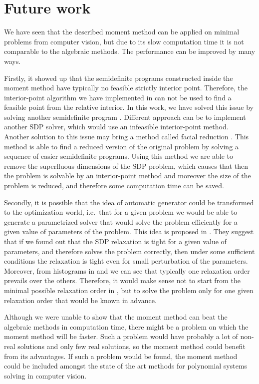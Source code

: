 \section{Future work}
We have seen that the described moment method can be applied on minimal problems from computer vision, but due to its slow computation time it is not comparable to the algebraic methods.
The performance can be improved by many ways.

Firstly, it showed up that the semidefinite programs constructed inside the moment method have typically no feasible strictly interior point.
Therefore, the interior-point algorithm we have implemented in  can not be used to find a feasible point from the relative interior.
In this work, we have solved this issue by solving another semidefinite program .
Different approach can be to implement another SDP solver, which would use an infeasible interior-point method.
Another solution to this issue may bring a method called facial reduction \cite{facial}.
This method is able to find a reduced version of the original problem by solving a sequence of easier semidefinite programs.
Using this method we are able to remove the superfluous dimensions of the SDP problem, which causes that then the problem is solvable by an interior-point method and moreover the size of the problem is reduced, and therefore some computation time can be saved.

Secondly, it is possible that the idea of automatic generator \cite{autogen} could be transformed to the optimization world, i.e.\ that for a given problem we would be able to generate a parametrized solver that would solve the problem efficiently for a given value of parameters of the problem.
This idea is proposed in \cite{SDPstability}.
They suggest that if we found out that the SDP relaxation is tight for a given value of parameters, and therefore solves the problem correctly, then under some sufficient conditions the relaxation is tight even for small perturbation of the parameters.
Moreover, from histograms in  and  we can see that typically one relaxation order prevails over the others.
Therefore, it would make sense not to start from the minimal possible relaxation order in , but to solve the problem only for one given relaxation order that would be known in advance.

Although we were unable to show that the moment method can beat the algebraic methods in computation time, there might be a problem on which the moment method will be faster.
Such a problem would have probably a lot of non-real solutions and only few real solutions, so the moment method could benefit from its advantages.
If such a problem would be found, the moment method could be included amongst the state of the art methods for polynomial systems  solving in computer vision.

